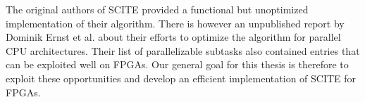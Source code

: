 The original authors of \ac{SCITE} provided a functional but unoptimized implementation of their algorithm. There is however an unpublished report by Dominik Ernst et al. \cite{ernst2020Performance} about their efforts to optimize the algorithm for parallel CPU architectures. Their list of parallelizable subtasks also contained entries that can be exploited well on \acp{FPGA}. Our general goal for this thesis is therefore to exploit these opportunities and develop an efficient implementation of \ac{SCITE} for \acp{FPGA}. 




